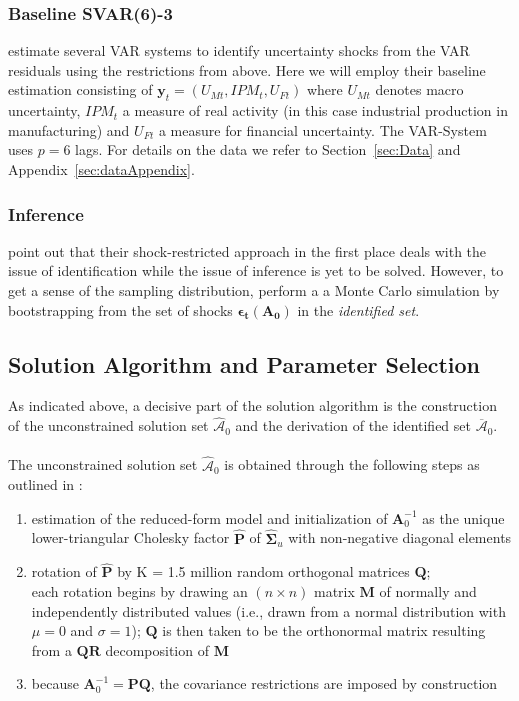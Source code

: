 \documentclass[a4paper,11pt,listof=nochaptergap,oneside,pointednumbers,bibtotoc,bigheadings,liststotoc,hidelinks]{scrbook}
\theoremstyle{mysatz}
\theoremstyle{mydefinition}
\theoremstyle{mytheorem}
\theoremstyle{mybemerkung}
\let\oldhat\hat
\newcommand{\vect}[1]{\boldsymbol{\mathbf{#1}}}
\newcommand{\hatt}[1]{\oldhat{\boldsymbol{\mathbf{#1}}}}
\begin{document}
\subsubsection{Baseline SVAR(6)-3}
\citet{ludvigsonetal:18,ludvigsonetal:19} estimate several VAR systems to identify uncertainty shocks from the VAR residuals using the restrictions from above. Here we will employ their baseline estimation consisting of $\vect{y}_t = (U_{Mt}, IPM_{t}, U_{Ft})$ where $U_{Mt}$ denotes macro uncertainty, $IPM_{t}$ a measure of real activity (in this case industrial production in manufacturing) and $U_{Ft}$ a measure for financial uncertainty. The VAR-System uses $p=6$ lags. For details on the data we refer to Section~\ref{sec:Data} and Appendix~\ref{sec:dataAppendix}.

\subsubsection{Inference}
\citep{ludvigsonetal:18,ludvigsonetal:19} point out that their shock-restricted approach in the first place deals with the issue of identification while the issue of inference is yet to be solved. However, to get a sense of the sampling distribution, \citet{ludvigsonetal:18, ludvigsonetal:19} perform a a Monte Carlo simulation by bootstrapping from the set of shocks $\vect{\epsilon_t}({\vect{A_0}})$ in the \textit{identified set}.


\subsection{Solution Algorithm and Parameter Selection}
\label{sec:solutionAlgorithm}
As indicated above, a decisive part of the solution algorithm is the construction of the unconstrained solution set $\hatt{\mathcal{A}}_0$ and the derivation of the identified set $\overline{\vect{\mathcal{A}}}_0$. \\
\\
The unconstrained solution set $\hatt{\mathcal{A}}_0$ is obtained through the following steps as outlined in \citet{ludvigsonetal:18,ludvigsonetal:19}:
\begin{enumerate}[i]
	\item estimation of the reduced-form model and initialization of $\vect{A}_0^{-1}$ as the unique lower-triangular Cholesky factor $\hatt{\vect{P}}$ of $\hatt{\vect{\Sigma}}_u$ with non-negative diagonal elements
	\item rotation of $\hatt{\vect{P}}$ by K = 1.5 million random orthogonal matrices $\vect{Q}$;\\
	 each rotation begins by drawing an $(n \times n)$ matrix $\vect{M}$ of normally and independently distributed values (i.e., drawn from a normal distribution with $\mu = 0$ and $\sigma = 1$); $\vect{Q}$ is then taken to be the orthonormal matrix resulting from a $\vect{Q}\vect{R}$ decomposition of $\vect{M}$
	 \item because $\vect{A}_0^{-1} = \vect{P}\vect{Q}$, the covariance restrictions are imposed by construction 
\end{enumerate}
\end{document}
